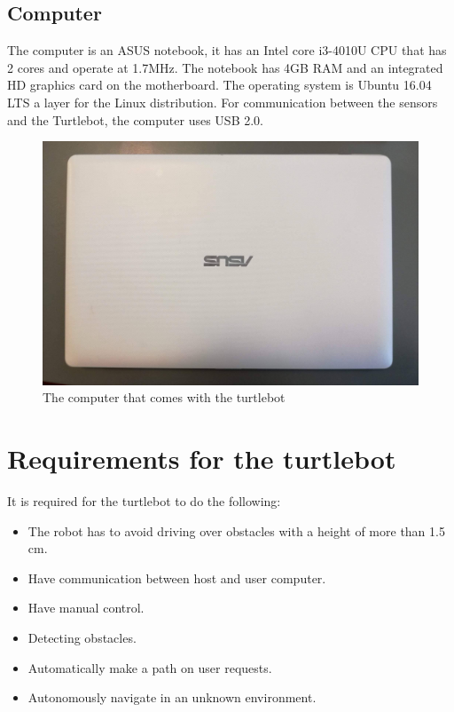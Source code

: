 \subsection{Computer} 
The computer is an ASUS notebook, it has an Intel core i3-4010U CPU that has 2 cores and operate at 1.7MHz\cite{CPU}. The notebook has 4GB RAM and an integrated HD graphics card on the motherboard\cite{ASUS}.
The operating system is Ubuntu 16.04 LTS a layer for the Linux distribution. For communication between the sensors and the Turtlebot, the computer uses USB 2.0.
\begin{figure}[h]
   \centering
    \includegraphics[width=.6\textwidth]{figures/ASUS.jpg}
    \caption{The computer that comes with the turtlebot}
    \label{fig:ASUS}
\end{figure}


\section{Requirements for the turtlebot}\label{ch:Requirements for the turtlebot}
It is required for the turtlebot to do the following:
\begin{itemize}
    \item The robot has to avoid driving over obstacles with a height of more than 1.5 cm.
    \item Have communication between host and user computer. 
    \item Have manual control.
    \item Detecting obstacles.
    \item Automatically make a path on user requests.
    \item Autonomously navigate in an unknown environment.
\end{itemize} 